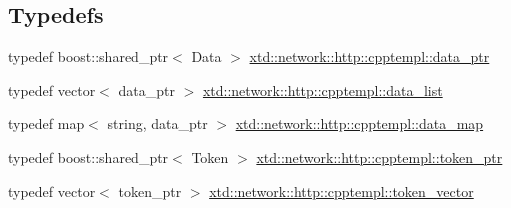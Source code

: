 \subsection*{Typedefs}
\begin{DoxyCompactItemize}
\item 
typedef boost\+::shared\+\_\+ptr$<$ Data $>$ \hyperlink{namespacextd_1_1network_1_1http_1_1cpptempl_ad2f49991f1902699a98cf62bf0ae7ce6}{xtd\+::network\+::http\+::cpptempl\+::data\+\_\+ptr}
\item 
typedef vector$<$ data\+\_\+ptr $>$ \hyperlink{namespacextd_1_1network_1_1http_1_1cpptempl_aff1b51bcf8064f69c85dd4833c1853b4}{xtd\+::network\+::http\+::cpptempl\+::data\+\_\+list}
\item 
typedef map$<$ string, data\+\_\+ptr $>$ \hyperlink{namespacextd_1_1network_1_1http_1_1cpptempl_a638d1d81c8fb63c0bbafd508d6a2a007}{xtd\+::network\+::http\+::cpptempl\+::data\+\_\+map}
\item 
typedef boost\+::shared\+\_\+ptr$<$ Token $>$ \hyperlink{namespacextd_1_1network_1_1http_1_1cpptempl_a09d1bd238d03342e60f0c20c679c0c88}{xtd\+::network\+::http\+::cpptempl\+::token\+\_\+ptr}
\item 
typedef vector$<$ token\+\_\+ptr $>$ \hyperlink{namespacextd_1_1network_1_1http_1_1cpptempl_a38606cfbbfe81ed46ea9b0cf064de956}{xtd\+::network\+::http\+::cpptempl\+::token\+\_\+vector}
\end{DoxyCompactItemize}
